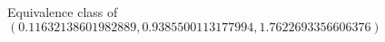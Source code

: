 \documentclass[preview]{standalone}
\begin{document}
\begin{center}
Equivalence class of $(0.11632138601982889, 0.9385500113177994, 1.7622693356606376)$
\end{center}
\end{document}

